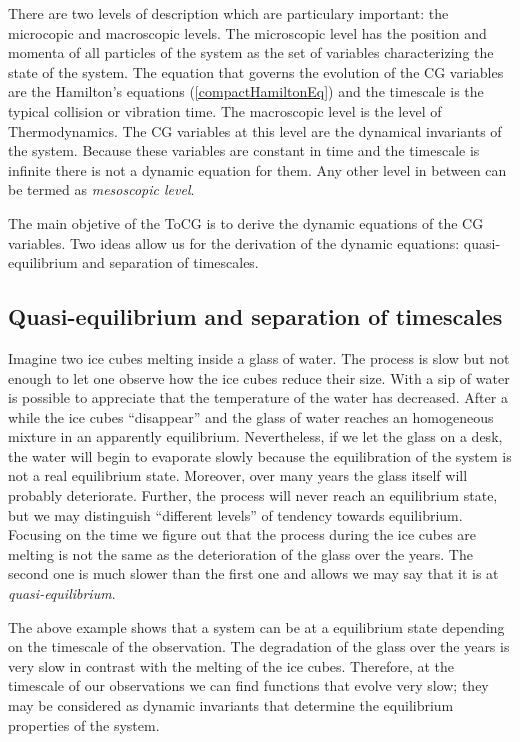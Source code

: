 \documentclass[b5paper,openright,10pt]{book}
\newcommand{\Pendiente}[1]{{\color{green}#1}} %
\begin{document}
There are two levels of description which are particulary important: the microcopic and macroscopic levels.
The microscopic level has the position and momenta of all particles of the system as the set of variables characterizing the state of the system. 
The equation that governs the evolution of the CG variables are the Hamilton's equations (\ref{compactHamiltonEq}) and the timescale is the typical collision or vibration time. 
The macroscopic level is the level of Thermodynamics. The CG variables at this level are the dynamical invariants of the system. Because these variables are constant in time and the timescale is infinite there is not a dynamic equation for them.  %
Any other level in between can be termed as {\it mesoscopic level}. 

The main objetive of the ToCG is to derive the dynamic equations of the CG variables. Two ideas allow us for the derivation of the dynamic equations: quasi-equilibrium and separation of timescales.

\subsection{Quasi-equilibrium and separation of timescales}
Imagine two ice cubes melting inside a glass of water. 
The process is slow but not enough to let one observe how the ice cubes reduce their size. 
With a sip of water is possible to appreciate that the temperature of the water has decreased. 
After a while the ice cubes ``disappear'' and the glass of water reaches an homogeneous mixture in an apparently equilibrium. 
Nevertheless, if we let the glass on a desk, the water will begin to evaporate slowly because the equilibration of the system is not a real equilibrium state. 
Moreover, over many years the glass itself will probably deteriorate. 
Further, the process will never reach an equilibrium state, but we may distinguish ``different levels'' of tendency towards equilibrium.  
\Pendiente{Focusing on the time we figure out that the process during the ice cubes are melting is not the same as the deterioration of the glass over the years.
The second one is much slower than the first one and allows we may say that it is at {\it quasi-equilibrium}.}

The above example shows that a system can be at a equilibrium state depending on the timescale of the observation. The degradation of the glass over the years is very slow in contrast with the melting of the ice cubes. Therefore, at the timescale of our observations we can find functions that evolve very slow; they may be considered as dynamic invariants that determine the equilibrium properties of the system. 
\end{document}
